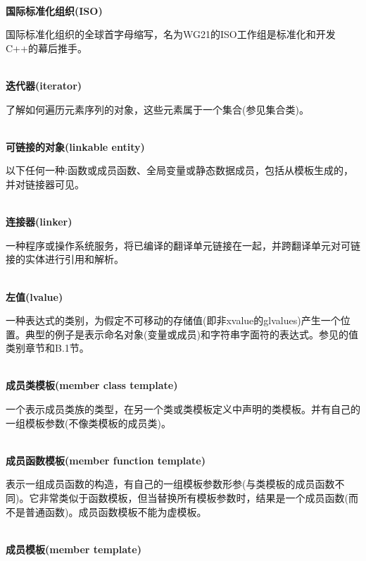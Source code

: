 \hspace*{\fill} \\ %
\noindent
\textbf{国际标准化组织(ISO)}

国际标准化组织的全球首字母缩写，名为WG21的ISO工作组是标准化和开发C++的幕后推手。

\hspace*{\fill} \\ %
\noindent
\textbf{迭代器(iterator)}

了解如何遍历元素序列的对象，这些元素属于一个集合(参见集合类)。

\hspace*{\fill} \\ %
\noindent
\textbf{可链接的对象(linkable entity)}

以下任何一种:函数或成员函数、全局变量或静态数据成员，包括从模板生成的，并对链接器可见。

\hspace*{\fill} \\ %
\noindent
\textbf{连接器(linker)}

一种程序或操作系统服务，将已编译的翻译单元链接在一起，并跨翻译单元对可链接的实体进行引用和解析。

\hspace*{\fill} \\ %
\noindent
\textbf{左值(lvalue)}

一种表达式的类别，为假定不可移动的存储值(即非xvalue的glvalues)产生一个位置。典型的例子是表示命名对象(变量或成员)和字符串字面符的表达式。参见的值类别章节和B.1节。

\hspace*{\fill} \\ %
\noindent
\textbf{成员类模板(member class template)}

一个表示成员类族的类型，在另一个类或类模板定义中声明的类模板。并有自己的一组模板参数(不像类模板的成员类)。

\hspace*{\fill} \\ %
\noindent
\textbf{成员函数模板(member function template)}

表示一组成员函数的构造，有自己的一组模板参数形参(与类模板的成员函数不同)。它非常类似于函数模板，但当替换所有模板参数时，结果是一个成员函数(而不是普通函数)。成员函数模板不能为虚模板。

\hspace*{\fill} \\ %
\noindent
\textbf{成员模板(member template)}

